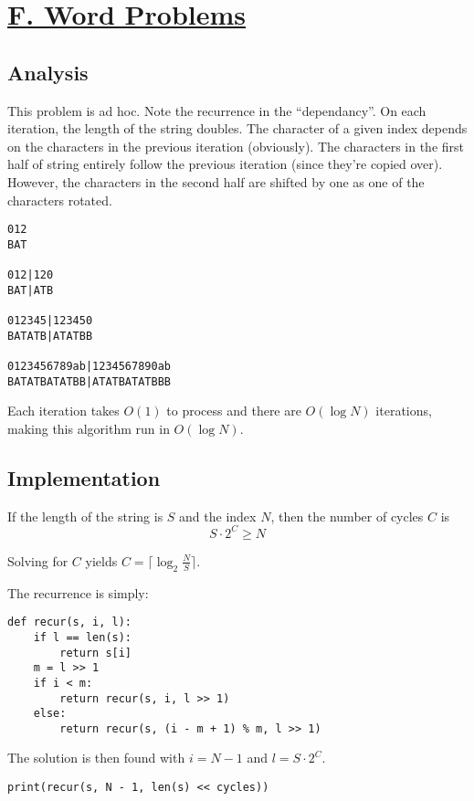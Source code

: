 \documentclass[11pt, oneside]{article}
\begin{document}
\newpage

\section{\href{https://codeforces.com/group/M4wsRWBHyZ/contest/259141/problem/F}{F. Word Problems}}

\subsection{Analysis}
This problem is ad hoc. Note the recurrence in the ``dependancy''.
On each iteration, the length of the string doubles.
The character of a given index depends on the
characters in the previous iteration (obviously). The characters
in the first half of string entirely follow the previous iteration (since they're copied over).
However, the characters in the second half are shifted by one as one of the characters rotated.

\begin{verbatim}
012
BAT

012|120
BAT|ATB

012345|123450
BATATB|ATATBB

0123456789ab|1234567890ab
BATATBATATBB|ATATBATATBBB
\end{verbatim}

Each iteration takes \( O(1) \) to process and there are \( O (\log N) \) iterations,
making this algorithm run in \( O(\log N) \).

\subsection{Implementation}

If the length of the string is \( S \) and the index \( N \), then the number of cycles \( C \)
is \[ S \cdot 2^C \geq N \]

Solving for \( C \) yields \( C = \lceil \log_2\frac{N}{S} \rceil \).

The recurrence is simply:
\begin{verbatim}
def recur(s, i, l):
    if l == len(s):
        return s[i]
    m = l >> 1
    if i < m:
        return recur(s, i, l >> 1)
    else:
        return recur(s, (i - m + 1) % m, l >> 1)
\end{verbatim}
The solution is then found with \( i = N - 1 \) and \( l = S \cdot 2^C \).
\begin{verbatim}
print(recur(s, N - 1, len(s) << cycles))
\end{verbatim}
\end{document}
